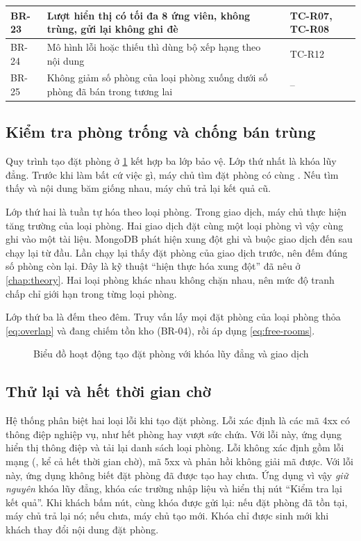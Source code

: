 \begin{rtable}
\begin{longtable}{|C{1.2cm}|L{7.0cm}|L{3.7cm}|L{2.9cm}|}
BR-23 & Lượt hiển thị có tối đa 8 ứng viên, không trùng, gửi lại không ghi đè &  & TC-R07, TC-R08 \\ \hline
BR-24 & Mô hình lỗi hoặc thiếu thì dùng bộ xếp hạng theo nội dung &  & TC-R12 \\ \hline
BR-25 & Không giảm số phòng của loại phòng xuống dưới số phòng đã bán trong tương lai &  & -- \\ \hline
\end{longtable}
\end{rtable}

\subsection{Kiểm tra phòng trống và chống bán trùng}

Quy trình tạo đặt phòng ở \cref{fig:act-create} kết hợp ba lớp bảo vệ. Lớp thứ nhất là khóa lũy đẳng. Trước khi làm bất cứ việc gì, máy chủ tìm đặt phòng có cùng . Nếu tìm thấy và nội dung băm giống nhau, máy chủ trả lại kết quả cũ.

Lớp thứ hai là tuần tự hóa theo loại phòng. Trong giao dịch, máy chủ thực hiện  tăng trường  của loại phòng. Hai giao dịch đặt cùng một loại phòng vì vậy cùng ghi vào một tài liệu. MongoDB phát hiện xung đột ghi và buộc giao dịch đến sau chạy lại từ đầu. Lần chạy lại thấy đặt phòng của giao dịch trước, nên đếm đúng số phòng còn lại. Đây là kỹ thuật ``hiện thực hóa xung đột'' đã nêu ở \cref{chap:theory}. Hai loại phòng khác nhau không chặn nhau, nên mức độ tranh chấp chỉ giới hạn trong từng loại phòng.

Lớp thứ ba là đếm theo đêm. Truy vấn lấy mọi đặt phòng của loại phòng thỏa \cref{eq:overlap} và đang chiếm tồn kho (BR-04), rồi áp dụng \cref{eq:free-rooms}.

\begin{figure}[H]
\centering
{}
\caption{Biểu đồ hoạt động tạo đặt phòng với khóa lũy đẳng và giao dịch}\label{fig:act-create}
\end{figure}

\subsection{Thử lại và hết thời gian chờ}\label{sec:retry-design}

Hệ thống phân biệt hai loại lỗi khi tạo đặt phòng. Lỗi xác định là các mã 4xx có thông điệp nghiệp vụ, như hết phòng hay vượt sức chứa. Với lỗi này, ứng dụng hiển thị thông điệp và tải lại danh sách loại phòng. Lỗi không xác định gồm lỗi mạng (, kể cả hết thời gian chờ), mã 5xx và phản hồi không giải mã được. Với lỗi này, ứng dụng không biết đặt phòng đã được tạo hay chưa. Ứng dụng vì vậy \emph{giữ nguyên} khóa lũy đẳng, khóa các trường nhập liệu và hiển thị nút ``Kiểm tra lại kết quả''. Khi khách bấm nút, cùng khóa được gửi lại: nếu đặt phòng đã tồn tại, máy chủ trả lại nó; nếu chưa, máy chủ tạo mới. Khóa chỉ được sinh mới khi khách thay đổi nội dung đặt phòng.


